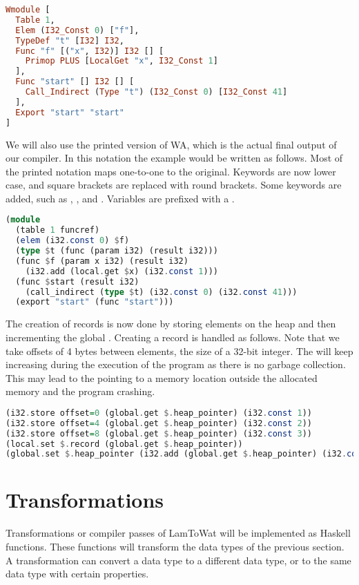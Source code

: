 {\begin{lstlisting}[language=Haskell]
Wmodule [
  Table 1,
  Elem (I32_Const 0) ["f"],
  TypeDef "t" [I32] I32,
  Func "f" [("x", I32)] I32 [] [
    Primop PLUS [LocalGet "x", I32_Const 1]
  ],
  Func "start" [] I32 [] [
    Call_Indirect (Type "t") (I32_Const 0) [I32_Const 41]
  ],
  Export "start" "start"
]
\end{lstlisting}

We will also use the printed version of \ac{WA}, which is the actual final output of our compiler. In this notation the example would be written as follows. Most of the printed notation maps one-to-one to the original. Keywords are now lower case, and square brackets are replaced with round brackets. Some keywords are added, such as , , and . Variables are prefixed with a \icode{$}. 

\begin{lstlisting}[language=Haskell]
(module
  (table 1 funcref)
  (elem (i32.const 0) $f)
  (type $t (func (param i32) (result i32)))
  (func $f (param x i32) (result i32)
    (i32.add (local.get $x) (i32.const 1)))
  (func $start (result i32)
    (call_indirect (type $t) (i32.const 0) (i32.const 41)))
  (export "start" (func "start")))
\end{lstlisting}

The creation of records is now done by storing elements on the heap and then incrementing the global . Creating a record  is handled as follows. Note that we take offsets of 4 bytes between elements, the size of a 32-bit integer. The  will keep increasing during the execution of the program as there is no garbage collection. This may lead to the  pointing to a memory location outside the allocated memory and the program crashing.

\begin{lstlisting}[language=Haskell]
(i32.store offset=0 (global.get $.heap_pointer) (i32.const 1))
(i32.store offset=4 (global.get $.heap_pointer) (i32.const 2))
(i32.store offset=8 (global.get $.heap_pointer) (i32.const 3))
(local.set $.record (global.get $.heap_pointer))
(global.set $.heap_pointer (i32.add (global.get $.heap_pointer) (i32.const 12)))
\end{lstlisting}

\section{\label{section:transforms}Transformations}
Transformations or compiler passes of LamToWat will be implemented as Haskell functions. These functions will transform the data types of the previous section. A transformation can convert a data type to a different data type, or to the same data type with certain properties.

}
